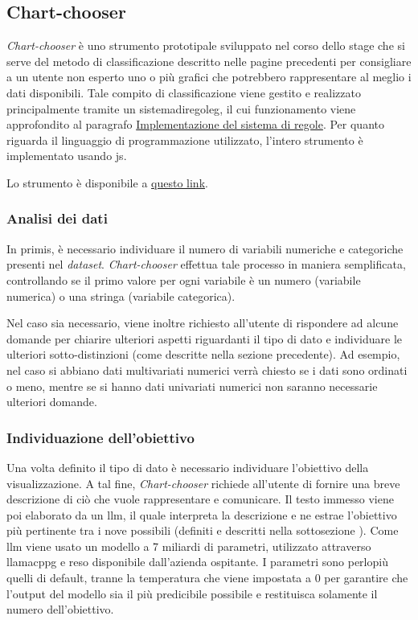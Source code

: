 \subsection{Chart-chooser}
\emph{Chart-chooser} è uno strumento prototipale sviluppato nel corso dello stage che si serve del metodo di classificazione descritto 
nelle pagine precedenti per consigliare a un utente non esperto uno o più grafici che potrebbero rappresentare al meglio i dati disponibili.
Tale compito di classificazione viene gestito e realizzato principalmente tramite un \gls{sistemadiregoleg}, il cui funzionamento viene approfondito al paragrafo
\hyperref[subsubsec:rules]{Implementazione del sistema di regole}. Per quanto riguarda il linguaggio di programmazione utilizzato, l'intero strumento è implementato usando
\gls{js}.

Lo strumento è disponibile a \href{https://github.com/jeskarr/progetto_stage/tree/main/chart-chooser}{questo link}.

\subsubsection{Analisi dei dati}
In primis, è necessario individuare il numero di variabili numeriche e categoriche presenti nel \emph{dataset}.
\emph{Chart-chooser} effettua tale processo in maniera semplificata, controllando se il primo valore per ogni variabile
è un numero (variabile numerica) o una stringa (variabile categorica).

Nel caso sia necessario, viene inoltre richiesto all'utente di rispondere ad alcune domande per chiarire ulteriori aspetti riguardanti il tipo 
di dato e individuare le ulteriori sotto-distinzioni (come descritte nella sezione precedente). Ad esempio, nel caso si abbiano dati multivariati numerici verrà chiesto 
se i dati sono ordinati o meno, mentre se si hanno dati univariati numerici non saranno necessarie ulteriori domande.

\subsubsection{Individuazione dell'obiettivo}
Una volta definito il tipo di dato è necessario individuare l'obiettivo della visualizzazione.
A tal fine, \emph{Chart-chooser} richiede all'utente di fornire una breve descrizione di ciò che vuole rappresentare e comunicare.
Il testo immesso viene poi elaborato da un \gls{llm}, il quale interpreta la descrizione e ne estrae l'obiettivo più pertinente tra i nove possibili (definiti e descritti nella sottosezione ). 
Come \gls{llm} viene usato un modello a 7 miliardi di parametri, utilizzato attraverso \gls{llamacppg} e reso disponibile dall'azienda ospitante. I parametri sono perlopiù quelli di default, tranne la temperatura che viene 
impostata a 0 per garantire che l'output del modello sia il più predicibile possibile e restituisca solamente il numero dell'obiettivo.


